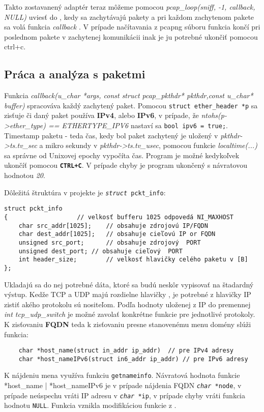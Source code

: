 \documentclass[11pt, a4paper]{article}
\begin{document}
	Takto zostavanený adaptér teraz môžeme pomocou \emph{pcap\_loop(sniff,  -1, callback, NULL)} uviesť do , kedy sa zachytávajú pakety a pri každom zachytenom pakete sa volá funkcia \emph{callback} \cite{Geeksniffer}. V prípade načítavania z pcapng súboru funkcia končí pri poslednom pakete v zachytenej komunikácii inak je ju potrebné ukončiť pomocou ctrl+c.
	
	\subsection{Práca a analýza s paketmi} 
	Funkcia \emph{callback(u\_char *args, const struct pcap\_pkthdr* pkthdr,const u\_char* buffer)} spracováva každý zachytený paket. Pomocou \texttt{struct ether\_header *p} sa zisťuje či daný paket používa \textbf{IPv4}, alebo \textbf{IPv6}, v prípade, že \emph{ntohs(p->ether\_type) == ETHERTYPE\_IPV6} nastaví sa \texttt{bool ipv6 = true;}. Timestamp paketu - teda čas, kedy bol paket zachytený je uložený v \emph{pkthdr->ts.tv\_sec} a mikro sekundy v \emph{pkthdr->ts.tv\_usec}, pomocou funkcie \emph{localtime(...)} sa správne od Unixovej epochy vypočíta čas. Program je možné kedykoľvek ukončíť pomocou \texttt{\textbf{CTRL+C}}. V prípade chyby je program ukončený s návratovou hodnotou \emph{20}.
	
	Dôležitá štruktúra v projekte je \texttt{\emph{struct} pckt\_info}:
	\begin{lstlisting}
struct pckt_info 
{					// velkosť bufferu 1025 odpovedá NI_MAXHOST 
    char src_addr[1025];	// obsahuje zdrojovú IP/FQDN  
    char dest_addr[1025];	// obsahuje cieľovú IP or FQDN
    unsigned src_port;		// obsahuje zdrojový  PORT
    unsigned dest_port;	// obsahuje cieľový  PORT
    int header_size;		// velkosť hlavičky celého paketu v [B] 
};
	\end{lstlisting}
	Ukladajú sa do nej potrebné dáta, ktoré sa budú neskôr vypisovať na štadardný výstup.
	Kedže TCP a UDP majú rozdielne hlavičky \cite{prednaskaTransport}, je potrebné z hlavičky IP zistiť akého protokolu sú nositeľom. Podľa hodnoty uloženej z IP do premennej \emph{int tcp\_udp\_switch} je možné zavolať konkrétne funkcie pre jednotlivé protokoly.
	K zisťovaniu \textbf{FQDN} teda k zisťovaniu presne stanovenému menu domény \cite{WikiFQDN} slúži funkcia:
	\begin{lstlisting}
	char *host_name(struct in_addr ip_addr)  // pre IPv4 adresy
	char *host_nameIPv6(struct in6_addr ip_addr) // pre IPv6 adresy
	\end{lstlisting}
	K nájdeniu mena využíva funkciu \texttt{getnameinfo}. Návratová hodnota funkcie *host\_name | *host\_nameIPv6 je v prípade nájdenia FQDN \texttt{\emph{char} *node}, v prípade neúspechu vráti IP adresu v \texttt{\emph{char} *ip}, v prípade chyby vráti funkcia hodnotu \texttt{NULL}. Funkcia vznikla modifikáciou funkcie z \cite{hostname}.
	
\end{document}

